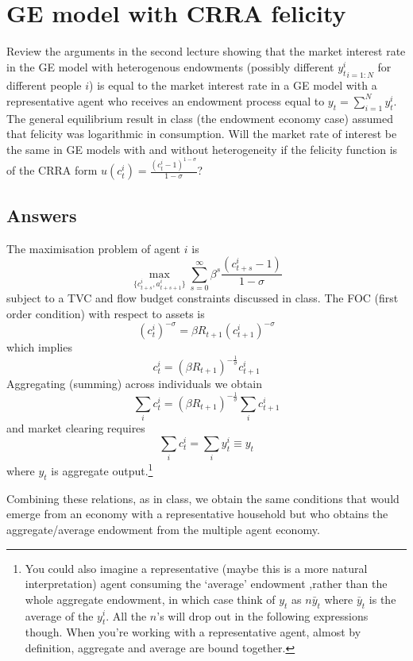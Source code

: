 \documentclass[authoryear,11pt]{elsarticle}
\begin{document}
\section{GE model with CRRA felicity}
Review the arguments in the second lecture showing that the market interest rate in the GE model with heterogenous endowments (possibly different ${y_{t}^{i}}_{i=1:N}$ for different people $i$) is equal to the market interest rate in a GE model with a representative agent who receives an endowment process equal to $y_{t}=\sum\limits_{i=1}^{N}y_{t}^{i}$. The general equilibrium result in class (the endowment economy case) assumed that felicity was logarithmic in consumption. Will the market rate of interest be the same in GE models with and without heterogeneity if the felicity function is of the CRRA form $u(c_{t}^{i})=\frac{(c_{t}^{i}-1)^{1-\sigma }}{1-\sigma }$?

\subsection*{Answers}
The maximisation problem of agent $i$ is
\[
\max_{\{c_{t+s}^{i},a_{t+s+1}^{i} \}} \sum\limits_{s=0}^{\infty} \beta^{s} \frac{(c_{t+s}^{i}-1)}{1-\sigma}
\]
subject to a TVC and flow budget constraints discussed in class. The FOC (first order condition) with respect to assets is
\[
(c_{t}^{i})^{-\sigma} = \beta R_{t+1} (c_{t+1}^{i})^{-\sigma}
\]
which implies
\[
c_{t}^{i} = (\beta R_{t+1})^{-\frac{1}{\sigma}}c_{t+1}^{i}
\]
Aggregating (summing) across individuals we obtain
\[
\sum\limits_{i}c_{t}^{i} = (\beta R_{t+1})^{-\frac{1}{\sigma}}\sum\limits_{i}c_{t+1}^{i}
\]
and market clearing requires
\[
\sum\limits_{i}c_{t}^{i} = \sum\limits_{i}y_{t}^{i} \equiv y_{t}
\]
where $y_{t}$ is aggregate output.\footnote{You could also imagine a representative (maybe this is a more natural interpretation) agent consuming the `average' endowment ,rather than the whole aggregate endowment, in which case think of $y_{t}$ as $n \bar{y}_{t}$ where $\bar{y}_{t}$ is the average of the $y_{t}^{i}$. All the $n$'s will drop out in the following expressions though. When you're working with a representative agent, almost by definition, aggregate and average are bound together.}

Combining these relations, as in class, we obtain the same conditions that would emerge from an economy with a representative household but who obtains the aggregate/average endowment from the multiple agent economy.
\end{document}
